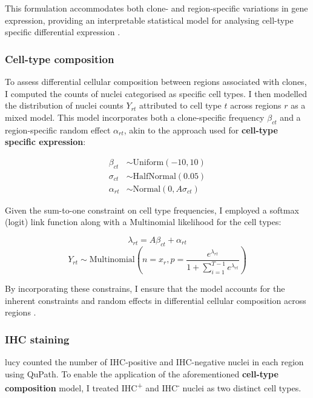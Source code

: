 This formulation accommodates both clone- and region-specific variations in gene expression, providing an interpretable statistical model for analysing cell-type specific differential expression .

\subsubsection*{Cell-type composition}

To assess differential cellular composition between regions associated with clones, I computed the counts of nuclei categorised as specific cell types. I then modelled the distribution of nuclei counts $Y_{rt}$ attributed to cell type $t$ across regions $r$ as a mixed model. This model incorporates both a clone-specific frequency $\beta_{ct}$ and a region-specific random effect $\alpha_{rt}$, akin to the approach used for \textbf{cell-type specific expression}:

\begin{align}
\beta_{ct} &\sim \text{Uniform}(-10, 10) \\
\sigma_{ct} &\sim \text{HalfNormal}(0.05) \\
\alpha_{rt} &\sim \text{Normal}(0, A\sigma_{ct})
\end{align}

Given the sum-to-one constraint on cell type frequencies, I employed a softmax (logit) link function along with a Multinomial likelihood for the cell types:

\begin{equation}
\lambda_{rt} = A\beta_{ct} + \alpha_{rt}
\end{equation}
\begin{equation}
Y_{rt} \sim \text{Multinomial}\left(n=x_r, p=\frac{e^{\lambda_{rt}}}{1 + \sum_{i=1}^{T-1} e^{\lambda_{rt}}}\right)
\end{equation}

By incorporating these constrains, I ensure that the model accounts for the inherent constraints and random effects in differential cellular composition across regions .

\subsubsection*{IHC staining}
\ac{lucy} counted the number of IHC-positive and IHC-negative nuclei in each region using QuPath. To enable the application of the aforementioned \textbf{cell-type composition} model, I treated IHC\textsuperscript{+} and IHC\textsuperscript{-} nuclei as two distinct cell types.

